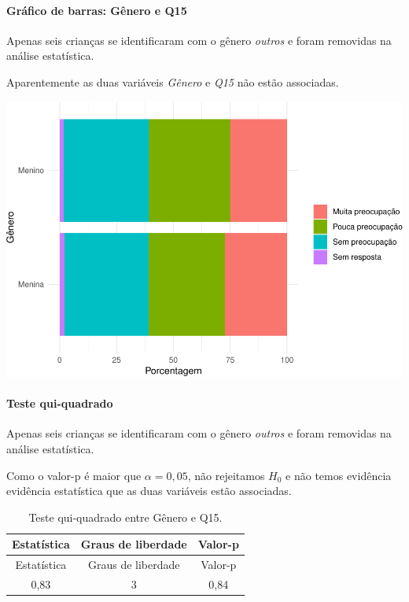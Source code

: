 \documentclass[]{article}
\let\oldparagraph\paragraph
\renewcommand{\paragraph}[1]{\oldparagraph{#1}\mbox{}}
\begin{document}
\hypertarget{gruxe1fico-de-barras-guxeanero-e-q15}{%
\paragraph{Gráfico de barras: Gênero e Q15}\label{gruxe1fico-de-barras-guxeanero-e-q15}}

Apenas seis crianças se identificaram com o gênero \emph{outros} e foram removidas na análise estatística.

Aparentemente as duas variáveis \emph{Gênero} e \emph{Q15} não estão associadas.

\begin{center}\includegraphics[width=0.75\linewidth]{relatorio_files/figure-latex/unnamed-chunk-106-1} \end{center}

\hypertarget{teste-qui-quadrado-8}{%
\paragraph{Teste qui-quadrado}\label{teste-qui-quadrado-8}}

Apenas seis crianças se identificaram com o gênero \emph{outros} e foram removidas na análise estatística.

Como o valor-p é maior que \(\alpha=0,05\), não rejeitamos \(H_0\) e não temos evidência evidência estatística que as duas variáveis estão associadas.

\begin{longtable}[]{@{}ccc@{}}
\caption{\label{tab:unnamed-chunk-107}Teste qui-quadrado entre Gênero e Q15.}\tabularnewline
\toprule
Estatística & Graus de liberdade & Valor-p\tabularnewline
\midrule
\endfirsthead
\toprule
Estatística & Graus de liberdade & Valor-p\tabularnewline
\midrule
\endhead
0,83 & 3 & 0,84\tabularnewline
\bottomrule
\end{longtable}
\end{document}
